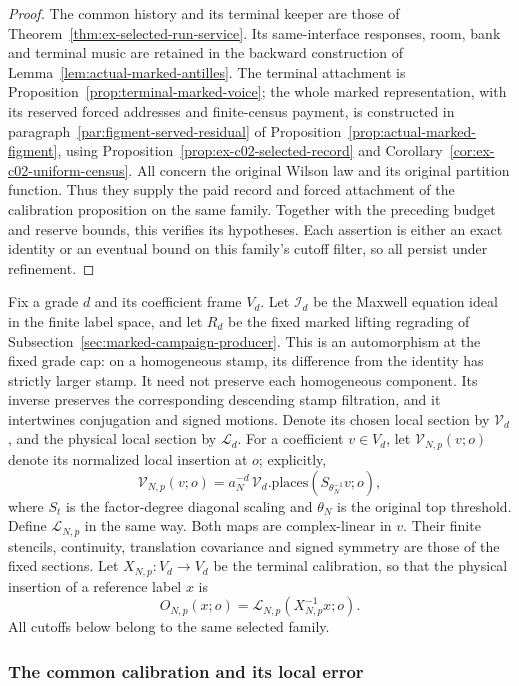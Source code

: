 \begin{proof}
The common history and its terminal keeper are those of
Theorem~\ref{thm:ex-selected-run-service}. Its same-interface responses,
room, bank and terminal music are retained in the backward construction
of Lemma~\ref{lem:actual-marked-antilles}. The terminal attachment is
Proposition~\ref{prop:terminal-marked-voice}; the whole marked
representation, with its reserved forced addresses and finite-census
payment, is constructed in paragraph~\ref{par:figment-served-residual}
of Proposition~\ref{prop:actual-marked-figment}, using
Proposition~\ref{prop:ex-c02-selected-record} and
Corollary~\ref{cor:ex-c02-uniform-census}. All concern the original
Wilson law and its original partition function. Thus they supply the
paid record and forced attachment of the calibration proposition on
the same family. Together with the preceding budget and reserve bounds,
this verifies its hypotheses. Each assertion is either an exact identity
or an eventual bound on this family's cutoff filter, so all persist
under refinement.
\end{proof}

Fix a grade $d$ and its coefficient frame $V_d$. Let $\mathcal I_d$ be
the Maxwell equation ideal in the finite label space, and let $R_d$ be
the fixed marked lifting regrading of
Subsection~\ref{sec:marked-campaign-producer}. This is an automorphism at
the fixed grade cap: on a homogeneous stamp, its difference from the
identity has strictly larger stamp. It need not preserve each homogeneous
component. Its inverse preserves the corresponding descending stamp
filtration, and it intertwines conjugation and signed motions.
Denote its chosen local
section by $\mathcal V_d$, and the physical local section by
$\mathcal L_d$. For a coefficient $v\in V_d$, let
$\mathcal V_{N,p}(v;o)$ denote its normalized local insertion at $o$;
explicitly,
\[
 \mathcal V_{N,p}(v;o)=a_N^{-d}\,
        \mathcal V_d.\mathrm{places}(S_{\theta_N^{-1}}v;o),
\]
where $S_t$ is the factor-degree diagonal scaling and $\theta_N$ is the
original top threshold. Define $\mathcal L_{N,p}$ in the same way.
Both maps are complex-linear
in $v$. Their finite stencils, continuity, translation covariance and
signed symmetry are those of the fixed sections. Let
$X_{N,p}:V_d\to V_d$ be the terminal calibration, so that the physical
insertion of a reference label $x$ is
\[
                  O_{N,p}(x;o)=\mathcal L_{N,p}(X_{N,p}^{-1}x;o).
\]
All cutoffs below belong to the same selected family.

\subsubsection{The common calibration and its local error}

